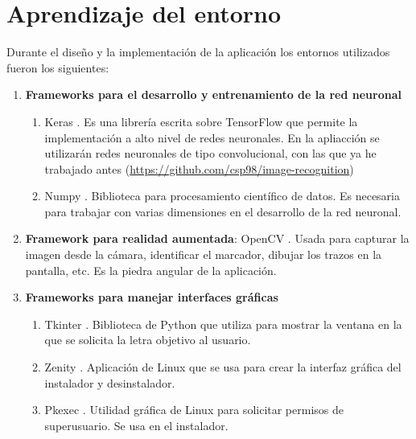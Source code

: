 \documentclass[12pt,spanish]{article}
\begin{document}
\section{Aprendizaje del entorno}

Durante el diseño y la implementación de la aplicación los entornos utilizados fueron los siguientes:
\begin{enumerate}
  \item \textbf{Frameworks para el desarrollo y entrenamiento de la red neuronal}
  \begin{enumerate}
    \item Keras \cite{Keras}. Es una librería escrita sobre TensorFlow \cite{tensorflow} que permite la implementación a alto nivel de redes neuronales. En la apliacción se utilizarán redes neuronales de tipo convolucional, con las que ya he trabajado antes (\url{https://github.com/csp98/image-recognition})
    \item Numpy \cite{numpy}. Biblioteca para procesamiento científico de datos. Es necesaria para trabajar con varias dimensiones en el desarrollo de la red neuronal.
  \end{enumerate}
  \item \textbf{Framework para realidad aumentada}: OpenCV \cite{opencv}. Usada para capturar la imagen desde la cámara, identificar el marcador, dibujar los trazos en la pantalla, etc. Es la piedra angular de la aplicación.
  \item \textbf{Frameworks para manejar interfaces gráficas}
    \begin{enumerate}
      \item Tkinter \cite{tkinter}. Biblioteca de Python \cite{python} que utiliza para mostrar la ventana en la que se solicita la letra objetivo al usuario.
      \item Zenity \cite{zenity}. Aplicación de Linux que se usa para crear la interfaz gráfica del instalador y desinstalador.
      \item Pkexec \cite{pkexec}. Utilidad gráfica de Linux para solicitar permisos de superusuario. Se usa en el instalador.
    \end{enumerate}

\end{enumerate}



\newpage


\end{document}
